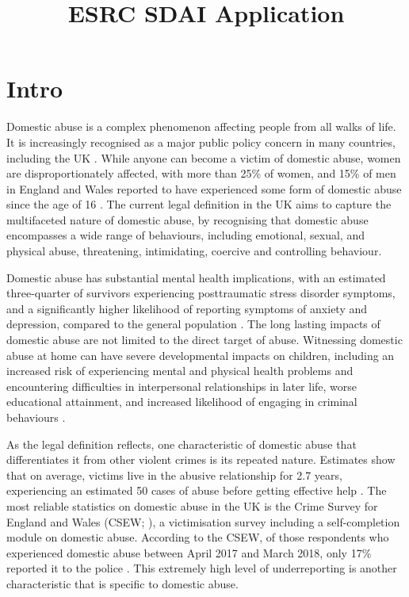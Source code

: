 \documentclass[12pt, letterpaper]{article}
\begin{document}
\title{ESRC SDAI Application}
\date{}
\maketitle

\section{Intro}

Domestic abuse is a complex phenomenon affecting people from all walks of life. It is increasingly recognised as a major public policy concern in many countries, including the UK \cite{ep}. While anyone can become a victim of domestic abuse, women are disproportionately affected, with more than 25\% of women, and 15\% of men in England and Wales reported to have experienced some form of domestic abuse since the age of 16 \cite{ONS}.  The current legal definition in the UK \cite{govuk} aims to capture the multifaceted nature of domestic abuse, by recognising that domestic abuse encompasses a wide range of behaviours, including emotional, sexual, and physical abuse, threatening, intimidating, coercive and controlling behaviour. 

Domestic abuse has substantial mental health implications, with an estimated three-quarter of survivors experiencing posttraumatic stress disorder symptoms, and a significantly higher likelihood of reporting symptoms of anxiety and depression, compared to the general population \cite{ferrari}. The long lasting impacts of domestic abuse are not limited to the direct target of abuse. Witnessing domestic abuse at home can have severe developmental impacts on children, including an increased risk of experiencing mental and physical health problems and encountering difficulties in interpersonal relationships in later life, worse educational attainment, and increased likelihood of engaging in criminal behaviours \cite{callaghan}.

As the legal definition reflects, one characteristic of domestic abuse that differentiates it from other violent crimes is its repeated nature. Estimates show that on average, victims live in the abusive relationship for 2.7 years, experiencing an estimated 50 cases of abuse before getting effective help \cite{SafeLives2015}. The most reliable statistics on domestic abuse in the UK is the Crime Survey for England and Wales (CSEW; ), a victimisation survey including a self-completion module on domestic abuse. According to the CSEW, of those respondents who experienced domestic abuse between April 2017 and March 2018, only 17\% reported it to the police \cite{ONS}. This extremely high level of underreporting is another characteristic that is specific to domestic abuse. 
\end{document}
